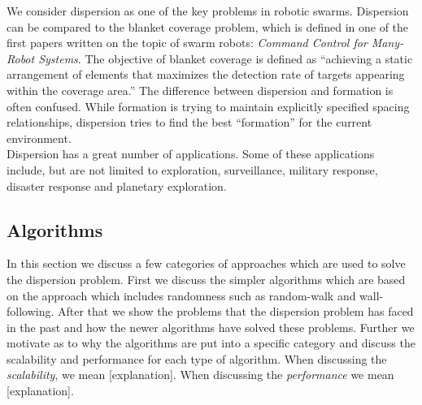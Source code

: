 
We consider dispersion as one of the key problems in robotic swarms.\cite{ugur2007dispersion,mclurkin2007distributed,ludwig2006robotic} Dispersion can be compared to the blanket coverage problem, which is defined in one of the first papers written on the topic of swarm robots: \emph{Command Control for Many-Robot Systems}. \cite{gage1992command} The objective of blanket coverage is defined as ``achieving a static arrangement of elements that maximizes the detection rate of targets appearing within the coverage area.''\cite{gage1992command} The difference between dispersion and formation is often confused. While formation is trying to maintain explicitly specified spacing relationships, dispersion tries to find the best ``formation'' for the current environment. \\
Dispersion has a great number of applications. Some of these applications include, but are not limited to exploration, surveillance, military response, disaster response and planetary exploration.\cite{ludwig2006robotic,Penders2011,mclurkin2007distributed} 

\subsection{Algorithms}
In this section we discuss a few categories of approaches which are used to solve the dispersion problem.
First we discuss the simpler algorithms which are based on the approach which includes randomness such as random-walk and wall-following.
After that we show the problems that the dispersion problem has faced in the past and how the newer algorithms have solved these problems.
Further we motivate as to why the algorithms are put into a specific category and discuss the scalability and performance for each type of algorithm.
When discussing the \emph{scalability}, we mean [explanation]. When discussing the \emph{performance} we mean [explanation]. 

